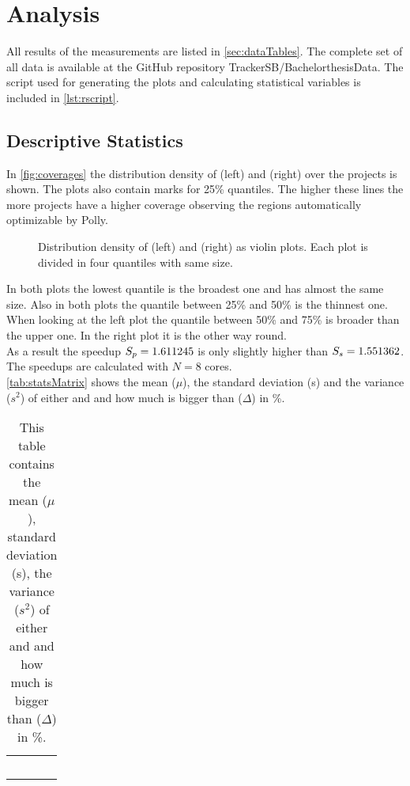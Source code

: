 \chapter{Analysis}
All results of the measurements are listed in \autoref{sec:dataTables}.
The complete set of all data is available at the GitHub repository TrackerSB/BachelorthesisData.
The script used for generating the plots and calculating statistical variables is included in \autoref{lst:rscript}.

\section{Descriptive Statistics}
In \autoref{fig:coverages} the distribution density of \dyncovs (left) and \dyncovp (right) over the projects is shown.
The plots also contain marks for 25\% quantiles.
The higher these lines the more projects have a higher coverage observing the regions automatically optimizable by Polly.
\begin{figure}[!h]
    \caption[Distribution density of \dyncovs and \dyncovp]{
        Distribution density of \dyncovs (left) and \dyncovp (right) as violin plots.
        Each plot is divided in four quantiles with same size.
    }
    
    \label{fig:coverages}
\end{figure}
In both plots the lowest quantile is the broadest one and has almost the same size.
Also in both plots the quantile between 25\% and 50\% is the thinnest one.
When looking at the left plot the quantile between 50\% and 75\% is broader than the upper one.
In the right plot it is the other way round.\\
As a result the speedup \(S_p=1.611245\) is only slightly higher than \(S_s=1.551362\).
The speedups are calculated with \(N=8\) cores.\\
\autoref{tab:statsMatrix} shows the mean (\(\mu\)), the standard deviation (s) and the variance (\(s^2\)) of either \dyncovp and \dyncovs and how much \dyncovp is bigger than \dyncovs (\(\Delta\)) in \%.
\begin{table}[!h]
    \myfloatalign
    \begin{tabularx}{\textwidth}{lCCC}
        \tableheadline{} &  & \tableheadline{\(\Delta\)} & \\\toprule
        \\\bottomrule
    \end{tabularx}
    \caption[Statistical evaluations of \dyncovp and \dyncovs]{
        This table contains the mean (\(\mu\)), standard deviation (s), the variance (\(s^2\)) of either \dyncovp and \dyncovs and how much \dyncovp is bigger than \dyncovs (\(\Delta\)) in \%.
    }
    \label{tab:statsMatrix}
\end{table}
